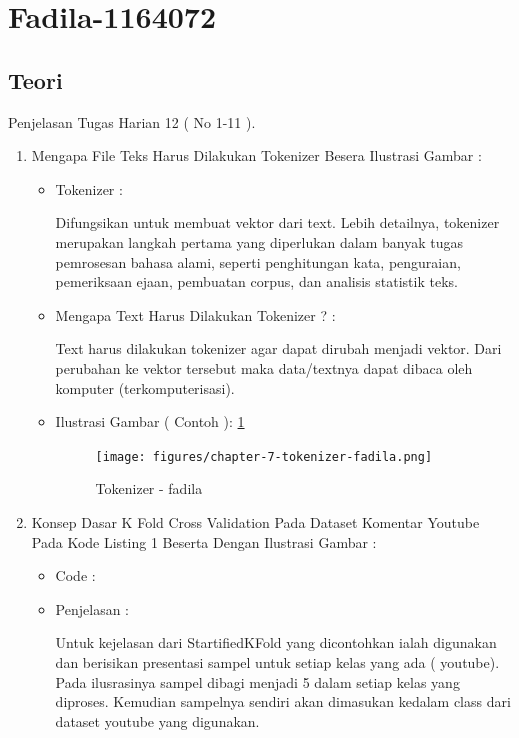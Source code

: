 \section{Fadila-1164072}
\subsection{Teori}
Penjelasan Tugas Harian 12 ( No 1-11 ).
\begin{enumerate}
\item Mengapa File Teks Harus Dilakukan Tokenizer Besera Ilustrasi Gambar :
\begin{itemize}
\item Tokenizer :
\par Difungsikan untuk membuat vektor dari text. Lebih detailnya, tokenizer merupakan langkah pertama yang diperlukan dalam banyak tugas pemrosesan bahasa alami, seperti penghitungan kata, penguraian, pemeriksaan ejaan, pembuatan corpus, dan analisis statistik teks.
\par
\par
\item Mengapa Text Harus Dilakukan Tokenizer ? :
\par Text harus dilakukan tokenizer agar dapat dirubah menjadi vektor. Dari perubahan ke vektor tersebut maka data/textnya dapat dibaca oleh komputer (terkomputerisasi).
\par
\par
\item Ilustrasi Gambar ( Contoh ): \ref{chapter-7-tokenizer-fadila}
\par
\begin{figure}[!hbtp]
\centering
\texttt{[image: figures/chapter-7-tokenizer-fadila.png]}
\caption{Tokenizer - fadila}
\label{chapter-7-tokenizer-fadila}
\end{figure}
\par
\end{itemize}
\par
\par
\item Konsep Dasar K Fold Cross Validation Pada Dataset Komentar Youtube Pada Kode Listing 1 Beserta Dengan Ilustrasi Gambar :
\begin{itemize}
\item Code		:

\item Penjelasan	: 
\par Untuk kejelasan dari StartifiedKFold yang dicontohkan ialah digunakan dan berisikan presentasi sampel untuk setiap kelas yang ada ( youtube). Pada ilusrasinya sampel dibagi menjadi 5 dalam setiap kelas yang diproses. Kemudian sampelnya sendiri akan dimasukan kedalam class dari dataset youtube yang digunakan.

\end{itemize}
\end{enumerate}
